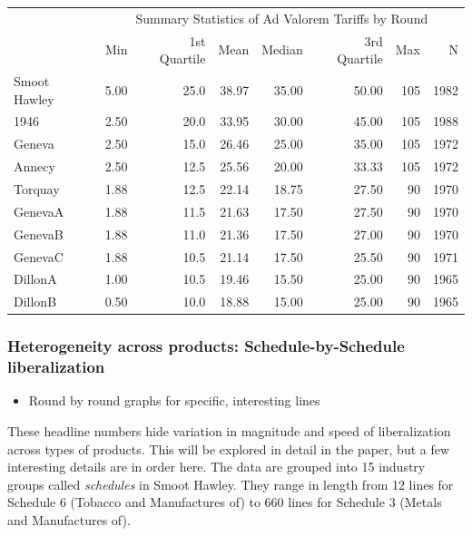 \documentclass[
  12pt,
]{article}
\providecommand{\tightlist}{%
  \setlength{\itemsep}{0pt}\setlength{\parskip}{0pt}}
\begin{document}
\begin{table}[!h]
\centering
\begin{tabular}[t]{lrrrrrrr}
\toprule
\multicolumn{1}{c}{\bgroup\fontsize{12}{14}\selectfont  \egroup{}} & \multicolumn{7}{c}{\bgroup\fontsize{12}{14}\selectfont Summary Statistics of Ad Valorem Tariffs by Round\egroup{}} \\
\cmidrule(l{3pt}r{3pt}){2-8}
  & Min & 1st Quartile & Mean & Median & 3rd Quartile & Max & N\\
\midrule
Smoot Hawley & 5.00 & 25.0 & 38.97 & 35.00 & 50.00 & 105 & 1982\\
1946 & 2.50 & 20.0 & 33.95 & 30.00 & 45.00 & 105 & 1988\\
Geneva & 2.50 & 15.0 & 26.46 & 25.00 & 35.00 & 105 & 1972\\
Annecy & 2.50 & 12.5 & 25.56 & 20.00 & 33.33 & 105 & 1972\\
Torquay & 1.88 & 12.5 & 22.14 & 18.75 & 27.50 & 90 & 1970\\
\addlinespace
GenevaA & 1.88 & 11.5 & 21.63 & 17.50 & 27.50 & 90 & 1970\\
GenevaB & 1.88 & 11.0 & 21.36 & 17.50 & 27.00 & 90 & 1970\\
GenevaC & 1.88 & 10.5 & 21.14 & 17.50 & 25.50 & 90 & 1971\\
DillonA & 1.00 & 10.5 & 19.46 & 15.50 & 25.00 & 90 & 1965\\
DillonB & 0.50 & 10.0 & 18.88 & 15.00 & 25.00 & 90 & 1965\\
\bottomrule
\end{tabular}
\end{table}

\hypertarget{heterogeneity-across-products-schedule-by-schedule-liberalization}{%
\subsubsection{Heterogeneity across products: Schedule-by-Schedule liberalization}\label{heterogeneity-across-products-schedule-by-schedule-liberalization}}

\begin{itemize}
\tightlist
\item
  Round by round graphs for specific, interesting lines
\end{itemize}

These headline numbers hide variation in magnitude and speed of liberalization across types of products. This will be explored in detail in the paper, but a few interesting details are in order here. The data are grouped into 15 industry groups called \emph{schedules} in Smoot Hawley. They range in length from 12 lines for Schedule 6 (Tobacco and Manufactures of) to 660 lines for Schedule 3 (Metals and Manufactures of).
\end{document}
